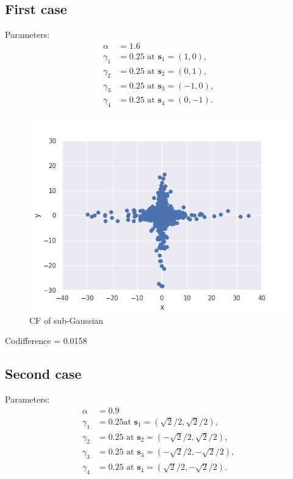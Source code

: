 \documentclass{article}
\begin{document}
	\subsection{First case}
	Parameters:
	$$
	\begin{aligned}
		\alpha &=1.6 \\
		\gamma_1 &=0.25 \text{ at } \mathbf{s}_1=(1,0),\\
		\gamma_2 &=0.25 \text{ at } \mathbf{s}_2=(0,1),\\
		\gamma_3 &=0.25 \text{ at } \mathbf{s}_3=(-1,0),\\
		\gamma_4 &=0.25 \text{ at } \mathbf{s}_4=(0,-1).
	\end{aligned}$$
	
	\begin{figure}[H]
		\centering
		\includegraphics[width=1\linewidth]{images/ex_5_1_alpha_stable_vector_simulation_discreet_scatter}
		\caption{CF of sub-Gaussian}\label{13}
	\end{figure}
	
	Codifference = 0.0158
	
	\subsection{Second case}
	Parameters:
	$$
	\begin{aligned}
		\alpha &=0.9 \\
		\gamma_1 &=0.25 \text {at } \mathbf{s}_1=(\sqrt{2} / 2, \sqrt{2} / 2),\\
		\gamma_2 &=0.25 \text{ at } \mathbf{s}_2=(-\sqrt{2} / 2, \sqrt{2} / 2),\\
		\gamma_3 &=0.25 \text{ at } \mathbf{s}_3=(-\sqrt{2} / 2,-\sqrt{2} / 2),\\
		\gamma_4 &=0.25 \text{ at } \mathbf{s}_4=(\sqrt{2} / 2,-\sqrt{2} / 2).
	\end{aligned}$$
	
\end{document}
